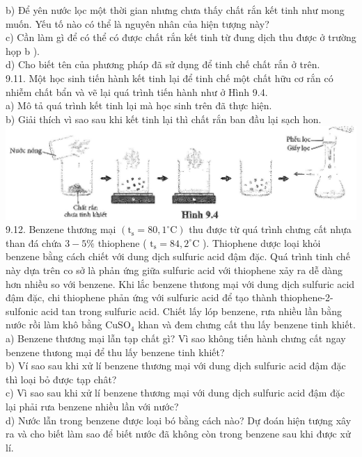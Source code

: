 \documentclass[10pt]{article}
\begin{document}
b) Để yên nước lọc một thời gian nhưng chưa thấy chất rắn kết tinh như mong muốn. Yếu tố nào có thể là nguyên nhân của hiện tượng này?\\
c) Cần làm gì để có thể có được chất rắn kết tinh từ đung dịch thu được ở trường họp b ).\\
d) Cho biết tên của phương pháp đã sử dụng để tinh chế chất rắn ở trên.\\
9.11. Một học sinh tiến hành kết tinh lại để tinh chế một chất hữu cơ rắn có nhiễm chất bẩn và vẽ lại quá trình tiến hành như ở Hình 9.4.\\
a) Mô tả quá trình kết tinh lại mà học sinh trên đã thực hiện.\\
b) Giải thích vì sao sau khi kết tinh lại thì chất rắn ban đầu lại sạch hon.\\
\includegraphics[max width=\textwidth, center]{2025_10_23_f2823ef970776205e47bg-29}\\
9.12. Benzene thương mại $\left(\mathrm{t}_{\mathrm{s}}=80,1^{\circ} \mathrm{C}\right)$ thu được từ quá trình chưng cất nhựa than đá chứa $3-5 \%$ thiophene ( $\mathrm{t}_{\mathrm{s}}=84,2^{\circ} \mathrm{C}$ ). Thiophene dược loại khỏi benzene bằng cách chiết với dung dịch sulfuric acid đậm đặc. Quá trình tinh chế này dựa trên co sở là phản ứng giữa sulfuric acid với thiophene xảy ra dễ dàng hơn nhiều so với benzene. Khi lắc benzene thưong mại với dung dịch sulfuric acid đậm đặc, chi thiophene phản ứng với sulfuric acid để tạo thành thiophene-2-sulfonic acid tan trong sulfuric acid. Chiết lấy lóp benzene, rưa nhiều lần bằng nước rồi làm khô bằng $\mathrm{CuSO}_{4}$ khan và đem chưng cất thu lấy benzene tinh khiết.\\
a) Benzene thương mại lẫn tạp chất gì? Vì sao không tiến hành chưng cất ngay benzene thưong mại để thu lấy benzene tinh khiết?\\
b) Ví sao sau khi xử lí benzene thương mại với dung dịch sulfuric acid đậm đặc thì loại bỏ được tạp chât?\\
c) Vì sao sau khi xử lí benzene thương mại với dung dịch sulfuric acid đậm đặc lại phải rưa benzene nhiều lần với nước?\\
d) Nước lẫn trong benzene được loại bó bằng cách nào? Dự đoán hiện tượng xây ra và cho biết làm sao để biết nước đã không còn trong benzene sau khi được xử lí.\\
\end{document}
